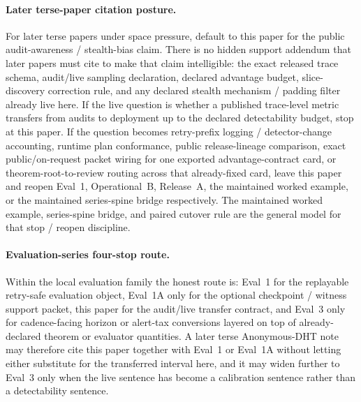 \documentclass[11pt]{article}
\begin{document}
\paragraph{Later terse-paper citation posture.}
For later terse papers under space pressure, default to this paper for the public audit-awareness / stealth-bias claim.
There is no hidden support addendum that later papers must cite to make that claim intelligible: the exact released trace schema, audit/live sampling declaration, declared advantage budget, slice-discovery correction rule, and any declared stealth mechanism / padding filter already live here.
If the live question is whether a published trace-level metric transfers from audits to deployment up to the declared detectability budget, stop at this paper.
If the question becomes retry-prefix logging / detector-change accounting, runtime plan conformance, public release-lineage comparison, exact public/on-request packet wiring for one exported advantage-contract card, or theorem-root-to-review routing across that already-fixed card, leave this paper and reopen Eval~1, Operational~B, Release~A, the maintained worked example, or the maintained series-spine bridge respectively.\cite{series:workedexample,series:seriesspines,series:pairedterminalcutoverrules}
The maintained worked example, series-spine bridge, and paired cutover rule are the general model for that stop / reopen discipline.\cite{series:workedexample,series:seriesspines,series:pairedterminalcutoverrules}

\paragraph{Evaluation-series four-stop route.}
Within the local evaluation family the honest route is: Eval~1 for the replayable retry-safe evaluation object, Eval~1A only for the optional checkpoint / witness support packet, this paper for the audit/live transfer contract, and Eval~3 only for cadence-facing horizon or alert-tax conversions layered on top of already-declared theorem or evaluator quantities.
A later terse Anonymous-DHT note may therefore cite this paper together with Eval~1 or Eval~1A without letting either substitute for the transferred interval here, and it may widen further to Eval~3 only when the live sentence has become a calibration sentence rather than a detectability sentence.
\end{document}
